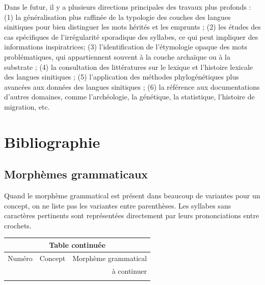 \documentclass{scrbook}
\newcounter{c}[subsubsection]
\begin{document}
\begin{sloppypar}
Dans le futur, il y a plusieurs directions principales des travaux plus profonds : (1) la généralisation plus raffinée de la typologie des couches des langues sinitiques pour bien distinguer les mots hérités et les emprunts ; (2) les études des cas spécifiques de l'irrégularité sporadique des syllabes, ce qui peut impliquer des informations inspiratrices; (3) l'identification de l'étymologie opaque des mots problématiques, qui appartiennent souvent à la couche archaïque ou à la substrate ; (4) la consultation des littératures sur le lexique et l'histoire lexicale des langues sinitiques ; (5) l'application des méthodes phylogénétiques plus avancées aux données des langues sinitiques ; (6) la référence aux documentations d'autres domaines, comme l'archéologie, la génétique, la statistique, l'histoire de migration, etc.





\newpage
\chapter*{Bibliographie}
\printbibliography[heading=none]

\newpage

\begin{appendices}

\chapter{Morphèmes grammaticaux}\label{appendice1}
Quand le morphème grammatical est présent dans beaucoup de variantes pour un concept, on ne liste pas les variantes entre parenthèses. Les syllabes sans caractères pertinents sont représentées directement par leurs prononciations entre crochets.

\begin{longtable}[htbp]{lll}
    \endfirsthead
	
	\multicolumn{3}{c}{Table continuée}\\
    \toprule
    Numéro & Concept & Morphème grammatical \\
    \hline
    \endhead

    \hline
    \multicolumn{3}{r}{à continuer} \\
    \endfoot
    \endlastfoot
    

\end{longtable}
\end{appendices}
\end{sloppypar}
\end{document}
